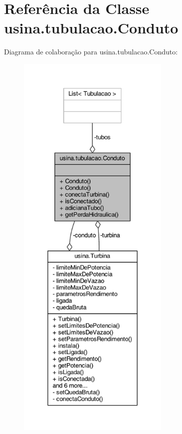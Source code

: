 \hypertarget{classusina_1_1tubulacao_1_1_conduto}{\section{Referência da Classe usina.\-tubulacao.\-Conduto}
\label{classusina_1_1tubulacao_1_1_conduto}
}


Diagrama de colaboração para usina.\-tubulacao.\-Conduto\-:
\nopagebreak
\begin{figure}[H]
\begin{center}
\leavevmode
\includegraphics[height=550pt]{classusina_1_1tubulacao_1_1_conduto__coll__graph}
\end{center}
\end{figure}
